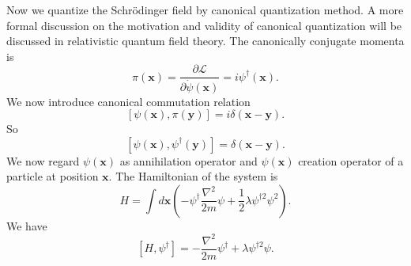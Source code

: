 Now we quantize the Schr\"{o}dinger field by canonical quantization method. A more formal discussion on the motivation and validity of canonical quantization will be discussed in relativistic quantum field theory.
The canonically conjugate momenta is
\[\pi(\bm{x}) = \frac{\partial \mathcal{L}}{\partial \dot{\psi}(\bm{x})} = i\psi^{\dagger}(\bm{x}).\] 
We now introduce canonical commutation relation
\[[\psi(\bm{x}),\pi(\bm{y})] = i\delta(\bm{x}-\bm{y}).\]
So
\[[\psi(\bm{x}),\psi^{\dagger}(\bm{y})] = \delta(\bm{x}-\bm{y}).\]
We now regard $\psi(\bm{x})$ as annihilation operator and $\psi(\bm{x})$ creation operator of a particle at position $\bm{x}$.
The Hamiltonian of the system is
\[H = \int d\bm{x} \left( -\psi^{\dagger}\frac{\nabla^2}{2m}\psi + \frac{1}{2}\lambda\psi^{\dagger 2}\psi^2 \right).\]
We have
\[[H,\psi^{\dagger}] = -\frac{\nabla^2}{2m}\psi^{\dagger} + \lambda \psi^{\dagger 2}\psi.\]

